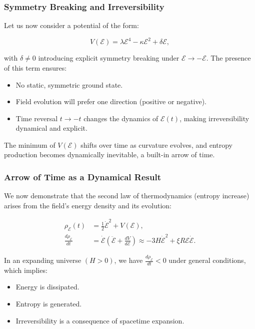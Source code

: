 \documentclass[12pt]{article}
\begin{document}
\subsubsection*{Symmetry Breaking and Irreversibility}

Let us now consider a potential of the form:

\begin{equation}
V(\mathcal{E}) = \lambda \mathcal{E}^4 - \kappa \mathcal{E}^2 + \delta \mathcal{E},
\end{equation}

with \( \delta \neq 0 \) introducing explicit symmetry breaking under \( \mathcal{E} \to -\mathcal{E} \). The presence of this term ensures:

\begin{itemize}
    \item No static, symmetric ground state.
    \item Field evolution will prefer one direction (positive or negative).
    \item Time reversal \( t \rightarrow -t \) changes the dynamics of \( \mathcal{E}(t) \), making irreversibility dynamical and explicit.
\end{itemize}

The minimum of \( V(\mathcal{E}) \) shifts over time as curvature evolves, and entropy production becomes dynamically inevitable, a built-in arrow of time.

\subsubsection*{Arrow of Time as a Dynamical Result}

We now demonstrate that the second law of thermodynamics (entropy increase) arises from the field's energy density and its evolution:

\begin{align}
\rho_{\mathcal{E}}(t) &= \frac{1}{2} \dot{\mathcal{E}}^2 + V(\mathcal{E}), \\
\frac{d\rho_{\mathcal{E}}}{dt} &= \dot{\mathcal{E}} \left( \ddot{\mathcal{E}} + \frac{dV}{d\mathcal{E}} \right) \approx -3H \dot{\mathcal{E}}^2 + \xi R \mathcal{E} \dot{\mathcal{E}}.
\end{align}

In an expanding universe \( (H > 0) \), we have \( \frac{d\rho_{\mathcal{E}}}{dt} < 0 \) under general conditions, which implies:

\begin{itemize}
    \item Energy is dissipated.
    \item Entropy is generated.
    \item Irreversibility is a consequence of spacetime expansion.
\end{itemize}
\end{document}
